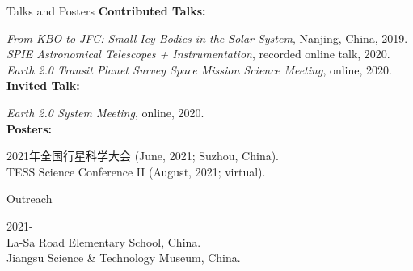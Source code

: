 \documentclass{resume} %
\begin{document}


\begin{rSection}{Talks and Posters}
{\bf Contributed Talks:}
 
\textit{From KBO to JFC: Small Icy Bodies in the Solar System}, Nanjing, China, 2019.\\
\textit{SPIE Astronomical Telescopes + Instrumentation}, recorded online talk, 2020.\\
\textit{Earth 2.0 Transit Planet Survey Space Mission Science Meeting}, online, 2020.
\\
{\bf Invited Talk:}

    \textit{Earth 2.0 System Meeting}, online, 2020.
\\
{\bf Posters:}

2021年全国行星科学大会 (June, 2021; Suzhou, China).\\
TESS Science Conference II (August, 2021; virtual).
\end{rSection}

\begin{rSection}{Outreach}

2021-\\
La-Sa Road Elementary School, China.\\
Jiangsu Science \& Technology Museum, China.
\end{rSection}
\end{document}
